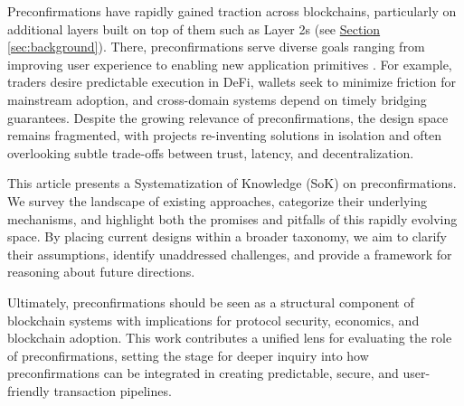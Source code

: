 \documentclass[a4paper]{article}
\theoremstyle{boldstyle}
\begin{document}
Preconfirmations have rapidly gained traction across blockchains, particularly on additional layers built on top of them such as Layer 2s (see \hyperref[sec:background]{Section \ref{sec:background}}). There, preconfirmations serve diverse goals ranging from improving user experience to enabling new application primitives \cite{Optimism,Arbitrum,ZKsync, W:TaikoPreconfDesign, W:JitoSolanaShreds}. For example, traders desire predictable execution in DeFi, wallets seek to minimize friction for mainstream adoption, and cross-domain systems depend on timely bridging guarantees. Despite the growing relevance of preconfirmations, the design space remains fragmented, with projects re-inventing solutions in isolation and often overlooking subtle trade-offs between trust, latency, and decentralization.

This article presents a Systematization of Knowledge (SoK) on preconfirmations. We survey the landscape of existing approaches, categorize their underlying mechanisms, and highlight both the promises and pitfalls of this rapidly evolving space. By placing current designs within a broader taxonomy, we aim to clarify their assumptions, identify unaddressed challenges, and provide a framework for reasoning about future directions.

Ultimately, preconfirmations should be seen as a structural component of blockchain systems with implications for protocol security, economics, and blockchain adoption. This work contributes a unified lens for evaluating the role of preconfirmations, setting the stage for deeper inquiry into how preconfirmations can be integrated in creating predictable, secure, and user-friendly transaction pipelines.
\end{document}
